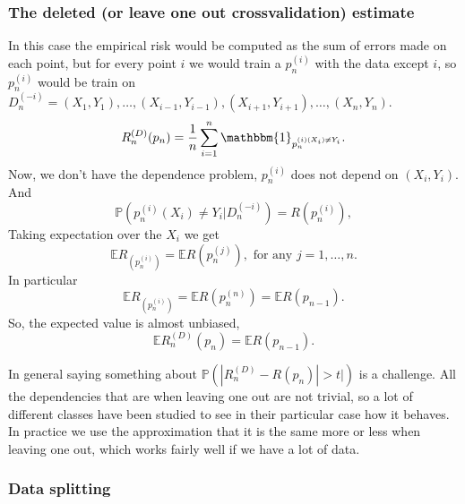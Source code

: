 \documentclass[11pt, english]{article}
\begin{document}
\subsubsection{The deleted (or leave one out crossvalidation) estimate}

In this case the empirical risk would be computed as the sum of errors made on each point, but for every point $i$ we would train a $p_n^{(i)}$ with the data except $i$, so $p_n^{(i)}$ would be train on $D_n^{(-i)}=(X_1,Y_1),\dots,(X_{i-1},Y_{i-1}), (X_{i+1},Y_{i+1}),\dots,(X_n,Y_n)$.
\begin{equation}
	R_n^{(D)}(p_n)=\frac{1}{n}\sum\limits_{i=1}^n\mathbbm{1}
_{p_n^{(i)(X_i)\neq Y_i}}.
\end{equation}
Now, we don't have the dependence problem, $p_n^(i)$ does not depend on $(X_i,Y_i)$. And
\begin{equation}
	\mathbb{P}(p_n^{(i)}(X_i)\neq Y_i|D_n^(-i))=R(p_n^(i)),
\end{equation}
Taking expectation over the $X_i$ we get
\begin{equation}
	\mathbb{E}R_(p_n^{(i)})=\mathbb{E}R(p_n^(j)),\text{ for any }j=1,\dots,n.
\end{equation}
In particular 
\begin{equation}
	\mathbb{E}R_(p_n^{(i)})=\mathbb{E}R(p_n^(n))=\mathbb{E}R(p_{n-1}).
\end{equation}
So, the expected value is almost unbiased, 
\begin{equation}
	\mathbb{E}R_n^(D)(p_n)=\mathbb{E}R(p_{n-1}).
\end{equation}

In general saying something about $\mathbb{P}(|R_n^{(D)}-R(p_n)|>t|)$ is a challenge. All the dependencies that are when leaving one out are not trivial, so a lot of different classes have been studied to see in their particular case how it behaves. In practice we use the approximation that it is the same more or less when leaving one out, which works fairly well if we have a lot of data.

\subsubsection{Data splitting}
\end{document}
